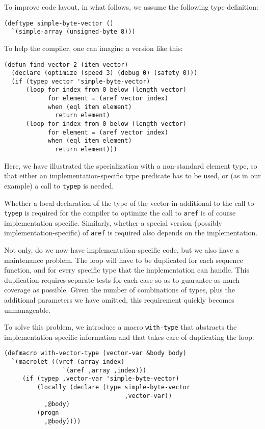 To improve code layout, in what follows, we assume the following type
definition:

{\small\begin{verbatim}
(deftype simple-byte-vector ()
  `(simple-array (unsigned-byte 8)))
\end{verbatim}}

To help the compiler, one can imagine a version like this:

{\small\begin{verbatim}
(defun find-vector-2 (item vector)
  (declare (optimize (speed 3) (debug 0) (safety 0)))
  (if (typep vector 'simple-byte-vector)
      (loop for index from 0 below (length vector)
            for element = (aref vector index)
            when (eql item element)
              return element)
      (loop for index from 0 below (length vector)
            for element = (aref vector index)
            when (eql item element)
              return element)))
\end{verbatim}}

Here, we have illustrated the specialization with a non-standard
element type, so that either an implementation-specific type predicate
has to be used, or (as in our example) a call to \texttt{typep} is
needed.

Whether a local declaration of the type of the vector in additional to
the call to \texttt{typep} is required for the compiler to optimize
the call to \texttt{aref} is of course implementation specific.
Similarly, whether a special version (possibly
implementation-specific) of \texttt{aref} is required also depends on
the implementation.

Not only, do we now have implementation-specific code, but we also
have a maintenance problem.  The loop will have to be duplicated for
each sequence function, and for every specific type that the
implementation can handle.  This duplication requires separate tests
for each case so as to guarantee as much coverage as possible.  Given
the number of combinations of types, plus the additional parameters we
have omitted, this requirement quickly becomes unmanageable.

To solve this problem, we introduce a macro \texttt{with-type} that
abstracts the implementation-specific information and that takes care
of duplicating the loop:

{\small\begin{verbatim}
(defmacro with-vector-type (vector-var &body body)
  `(macrolet ((vref (array index)
                `(aref ,array ,index)))
     (if (typep ,vector-var 'simple-byte-vector)
         (locally (declare (type simple-byte-vector
                                 ,vector-var))
           ,@body)
         (progn
           ,@body))))
\end{verbatim}}

